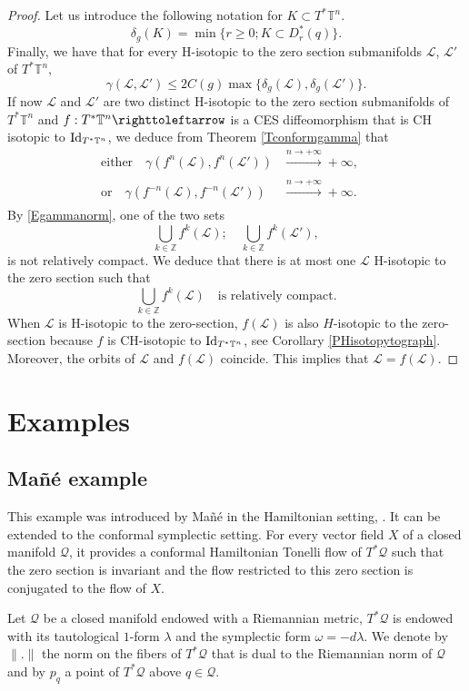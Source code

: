 \documentclass[10pt]{amsart}
\theoremstyle{definition}
\def\Z{\mathbb{Z}}
\def\T{\mathbb{T}}
\def\cL{{\mathcal L}}
\def\cQ{{\mathcal Q}}
\begin{document}
\begin{proof}
Let us introduce the following notation for $K\subset T^*\T^n$.
\[
\delta_g(K)=\min\{r\geq 0; K\subset D^*_r(q)\}.
\]
Finally, we have that for every H-isotopic to the zero section submanifolds $\cL$, $\cL'$ of $T^*\T^n$,
\begin{equation}\label{Egammanorm}
\gamma(\cL, \cL')\leq 2C(g)\max\{\delta_g(\cL), \delta_g(\cL')\}.
\end{equation}
If now $\cL$ and $\cL'$ are two distinct H-isotopic to the zero section submanifolds of $T^*\T^n$ and $f: T^*\T^n \righttoleftarrow$ is a CES diffeomorphism that is CH isotopic to ${\rm Id}_{T^*\T^n}$, we deduce from Theorem \ref{Tconformgamma} that
\begin{align*}
\text{either}\quad\gamma (f^n(\cL), f^n(\cL'))&\xrightarrow[]{n\to +\infty}+\infty,\quad
\\
\text{or}\quad\gamma (f^{-n}(\cL), f^{-n}(\cL'))&\xrightarrow[]{n\to +\infty}+\infty.
\end{align*}
By \eqref{Egammanorm}, one of the two sets
\[
\bigcup_{k\in\Z}f^k(\cL);\quad \bigcup_{k\in\Z}f^k(\cL'),
\]
is not relatively compact. We deduce that there is at most one $\cL$ H-isotopic to the zero section such that
\[
\bigcup_{k\in\Z}f^k(\cL)\quad\text{is relatively compact}.
\]
When $\cL$ is H-isotopic to the zero-section, $f(\cL)$ is also $H$-isotopic to the zero-section because $f$ is CH-isotopic to ${\rm Id}_{T^*\T^n}$, see Corollary \ref{PHisotopytograph}. Moreover, the orbits of $\cL$ and $f(\cL)$ coincide. This implies that $\cL=f(\cL)$.
\end{proof}

\section{Examples}\label{AExamples}

\subsection{Mañé example}\label{SecMan}

This example was introduced by Mañé in the Hamiltonian setting, \cite{Man1992}. It can be extended to the conformal symplectic setting. For every vector field $X$ of a closed manifold $\cQ$, it provides a conformal Hamiltonian Tonelli flow of $T^*\cQ$ such that the zero section is invariant and the flow restricted to this zero section is conjugated to the flow of $X$.

Let $\cQ$ be a closed manifold endowed with a Riemannian metric, $T^*\cQ$ is endowed with its tautological $1$-form $\lambda$ and the symplectic form $\omega=-d\lambda$. We denote by $\|.\|$ the norm on the fibers of $T^*\cQ$ that is dual to the Riemannian norm of $\cQ$ and by $p_q$ a point of $T^*\cQ$ above $q \in \cQ$.
\end{document}
